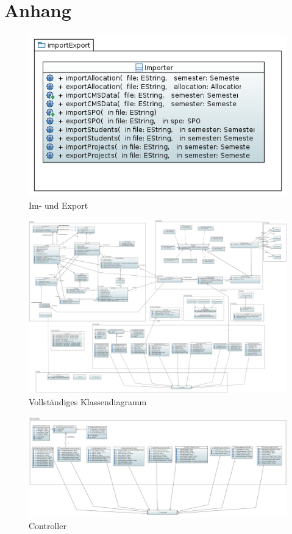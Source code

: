 \documentclass[parskip=full]{scrartcl}
\begin{document}
\section{Anhang}
\begin{figure}[!htb]
\centering
\includegraphics[width=\linewidth]{bilder/importExport.png}
\caption{Im- und Export}
\label{uml:imExport}
\end{figure}
\begin{figure}
\centering
\includegraphics[width=\linewidth]{bilder/Class_Diagram.png}
\caption{Vollständiges Klassendiagramm}
\label{uml:classDiagram}
\end{figure}

\begin{figure}
\centering
\includegraphics[width=\linewidth]{bilder/controller.png}
\caption{Controller}
\label{uml:controller}
\end{figure}
\end{document}
